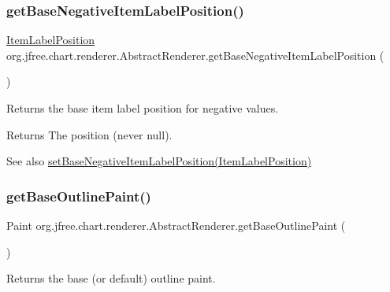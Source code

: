 \subsubsection{\texorpdfstring{get\+Base\+Negative\+Item\+Label\+Position()}{getBaseNegativeItemLabelPosition()}}
{\footnotesize\ttfamily \mbox{\hyperlink{classorg_1_1jfree_1_1chart_1_1labels_1_1_item_label_position}{Item\+Label\+Position}} org.\+jfree.\+chart.\+renderer.\+Abstract\+Renderer.\+get\+Base\+Negative\+Item\+Label\+Position (\begin{DoxyParamCaption}{ }\end{DoxyParamCaption})}

Returns the base item label position for negative values.

\begin{DoxyReturn}{Returns}
The position (never {\ttfamily null}).
\end{DoxyReturn}
\begin{DoxySeeAlso}{See also}
\mbox{\hyperlink{classorg_1_1jfree_1_1chart_1_1renderer_1_1_abstract_renderer_a7b884e49e671f85f564084b3be63aa3d}{set\+Base\+Negative\+Item\+Label\+Position(\+Item\+Label\+Position)}} 
\end{DoxySeeAlso}
\mbox{\label{classorg_1_1jfree_1_1chart_1_1renderer_1_1_abstract_renderer_a431b943b37813034936dff4c167deb30}} 
\subsubsection{\texorpdfstring{get\+Base\+Outline\+Paint()}{getBaseOutlinePaint()}}
{\footnotesize\ttfamily Paint org.\+jfree.\+chart.\+renderer.\+Abstract\+Renderer.\+get\+Base\+Outline\+Paint (\begin{DoxyParamCaption}{ }\end{DoxyParamCaption})}

Returns the base (or default) outline paint.

